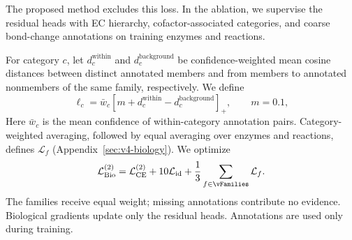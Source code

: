 The proposed method excludes this loss. In the ablation, we supervise the
residual heads with EC hierarchy, cofactor-associated
categories, and coarse bond-change annotations on training enzymes and reactions.

For category $c$, let $d_c^{\mathrm{within}}$ and $d_c^{\mathrm{background}}$
be confidence-weighted mean cosine distances between distinct annotated
members and from members to annotated nonmembers of the same family,
respectively. We define
\begin{equation}
 \ell_c=\bar w_c\left[m+d_c^{\mathrm{within}}
                       -d_c^{\mathrm{background}}\right]_+,\qquad m=0.1,
 \label{eq:ablation-relative-biology}
\end{equation}
Here $\bar w_c$ is the mean confidence of within-category annotation pairs.
Category-weighted averaging, followed by equal averaging over enzymes and
reactions, defines $\mathcal L_f$ (Appendix~\ref{sec:v4-biology}). We optimize
\begin{equation}
 \mathcal L_{\mathrm{Bio}}^{(2)}=\mathcal L_{\mathrm{CE}}^{(2)}+10\mathcal L_{\mathrm{id}}
       +\frac13\sum_{f\in\vFamilies}\mathcal L_f.
 \label{eq:ablation-phase2-total}
\end{equation}
The families receive equal weight; missing annotations contribute no evidence.
Biological gradients update only the residual heads. Annotations are used
only during training.
